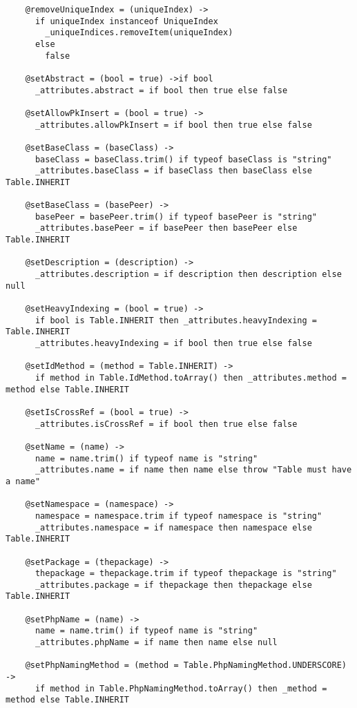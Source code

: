 \begin{lstlisting}
    @removeUniqueIndex = (uniqueIndex) ->
      if uniqueIndex instanceof UniqueIndex
        _uniqueIndices.removeItem(uniqueIndex)
      else
        false
      
    @setAbstract = (bool = true) ->if bool
      _attributes.abstract = if bool then true else false
      
    @setAllowPkInsert = (bool = true) ->
      _attributes.allowPkInsert = if bool then true else false
      
    @setBaseClass = (baseClass) ->
      baseClass = baseClass.trim() if typeof baseClass is "string"
      _attributes.baseClass = if baseClass then baseClass else Table.INHERIT
      
    @setBaseClass = (basePeer) ->
      basePeer = basePeer.trim() if typeof basePeer is "string"
      _attributes.basePeer = if basePeer then basePeer else Table.INHERIT
      
    @setDescription = (description) ->
      _attributes.description = if description then description else null
      
    @setHeavyIndexing = (bool = true) ->
      if bool is Table.INHERIT then _attributes.heavyIndexing = Table.INHERIT
      _attributes.heavyIndexing = if bool then true else false
      
    @setIdMethod = (method = Table.INHERIT) ->
      if method in Table.IdMethod.toArray() then _attributes.method =  method else Table.INHERIT
      
    @setIsCrossRef = (bool = true) ->
      _attributes.isCrossRef = if bool then true else false
    
    @setName = (name) ->
      name = name.trim() if typeof name is "string"
      _attributes.name = if name then name else throw "Table must have a name"
      
    @setNamespace = (namespace) ->
      namespace = namespace.trim if typeof namespace is "string"
      _attributes.namespace = if namespace then namespace else Table.INHERIT
      
    @setPackage = (thepackage) ->
      thepackage = thepackage.trim if typeof thepackage is "string"
      _attributes.package = if thepackage then thepackage else Table.INHERIT
      
    @setPhpName = (name) ->
      name = name.trim() if typeof name is "string"
      _attributes.phpName = if name then name else null
      
    @setPhpNamingMethod = (method = Table.PhpNamingMethod.UNDERSCORE) ->
      if method in Table.PhpNamingMethod.toArray() then _method = method else Table.INHERIT
      

\end{lstlisting}
